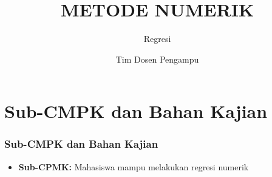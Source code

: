 \documentclass[pdflatex,compress,mathserif]{beamer}
\title{METODE NUMERIK}
\subtitle{Regresi}
\author{Tim Dosen Pengampu}
\begin{document}
\maketitle

\section{Sub-CMPK dan Bahan Kajian}

\begin{frame}
	\frametitle{Sub-CMPK dan Bahan Kajian}
	\begin{itemize}
		\item \textbf{Sub-CPMK:} Mahasiswa mampu melakukan regresi numerik
		
	\end{itemize}
\end{frame}
\end{document}
